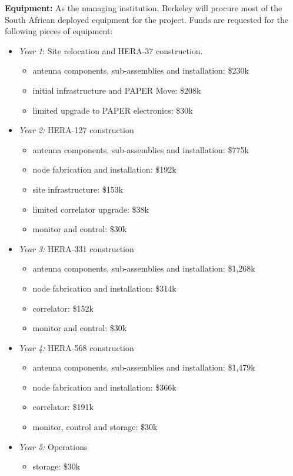 \documentclass[onecolumn,11pt]{aastex}
\begin{document}
{\bf Equipment:}  As the managing institution, Berkeley will procure most of the South African deployed equipment for the project.  Funds are requested for the following pieces of equipment:
\begin{itemize}
\item {\em Year 1}:  Site relocation and HERA-37 construction.
\begin{itemize}
	\item antenna components, sub-assemblies and installation:  \$230k
	\item initial infrastructure and PAPER Move:  \$208k
	\item limited upgrade to PAPER electronics:  \$30k
\end{itemize}
\item {\em Year 2:}  HERA-127 construction
\begin{itemize}
	\item antenna components, sub-assemblies and installation:  \$775k
	\item node fabrication and installation:  \$192k
	\item site infrastructure:  \$153k
	\item limited correlator upgrade:  \$38k
	\item monitor and control:  \$30k
\end{itemize}
\item {\em Year 3:}  HERA-331 construction
\begin{itemize}
	\item antenna components, sub-assemblies and installation:  \$1,268k
	\item node fabrication and installation:  \$314k
	\item correlator:  \$152k
	\item monitor and control:  \$30k
\end{itemize}
\item {\em Year 4:}  HERA-568 construction
\begin{itemize}
	\item antenna components, sub-assemblies and installation:  \$1,479k
	\item node fabrication and installation:  \$366k
	\item correlator:  \$191k
	\item monitor, control and storage:  \$30k
\end{itemize}
\item {\em Year 5:}  Operations
\begin{itemize}
	\item storage:  \$30k
\end{itemize}

\end{itemize}
\end{document}
